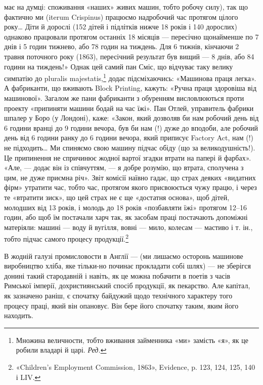 \parcont{}  %
має на думці: споживання «наших» живих машин, тобто робочу
силу), так що фактично ми (iterum Crispinus) працюємо надробочий
час протягом цілого року\dots{} Діти й дорослі (152 дітей і
підлітків нижче 18 років і 140 дорослих) однаково працювали
протягом останніх 18 місяців — пересічно щонайменше по 7 днів
і 5 годин тижнево, або 78 годин на тиждень. Для 6 тижнів,
кінчаючи 2 травня поточного року (1863), пересічний результат
був вищий — 8 днів, або 84 години на тиждень!» Однак  цей самий
пан Сміс, що відчуває таку велику симпатію до pluralis majestatis,\footnote*{
Множина величности, тобто вживання займенника «ми» замість
«я», як це робили владарі й царі. \emph{Ред.}
}
додає підсміхаючись: «Машинова праця легка». А фабриканти,
що вживають Block Printing, кажуть: «Ручна праця
здоровіша від машинової». Загалом же пани фабриканти з обуренням
висловлюються проти проекту «припиняти машини бодай
на час їжі». Пан Отлей, управитель фабрики шпалер у Боро
(у Лондоні), каже: «Закон, який дозволяв би нам робочий день
від 6 години вранці до 9 години вечора, був би нам (!) дуже до вподоби,
але робочий день від 6 години ранку до 6 години вечора,
який приписує Factory Act, нам (!) не підходить\dots{} Ми спиняємо
свою машину підчас обіду (що за великодушність!). Це припинення
не спричинює жодної вартої згадки втрати на папері й фарбах».
«Але, — додає він із співчуттям, — я добре розумію, що втрата,
сполучена з цим, не дуже приємна річ». Звіт комісії наївно гадає,
що страх деяких «видатних фірм» утратити час, тобто час, протягом
якого присвоюється чужу працю, і через те «втратити зиск»,
що цей страх не є ще «достатня основа», щоб дітей, молодших
від 13 років, і молодь до 18 років «позбавляти їжі» протягом
12--16 годин, або щоб їм постачали харч так, як засобам праці
постачають допоміжні матеріяли: машині — воду й вугілля,
вовні — мило, колесам — мастиво і т. ін., тобто підчас самого
процесу продукції.\footnote{
«Children’s Employment Commission, 1863», Evidence, p. 123,
124, 125, 140 і LIV.
}

В жодній галузі промисловости в Англії — (ми лишаємо осторонь
машинове виробництво хліба, яке тільки-но починає прокладати
собі шлях) — не зберігся донині такий стародавній
і навіть, як це можна побачити в поетів з часів Римської імперії,
дохристиянський спосіб продукції, як пекарство. Але капітал,
як зазначено раніш, є спочатку байдужий щодо технічного характеру
того процесу праці, який він опановує. Він бере його
спочатку таким, яким його находить.

